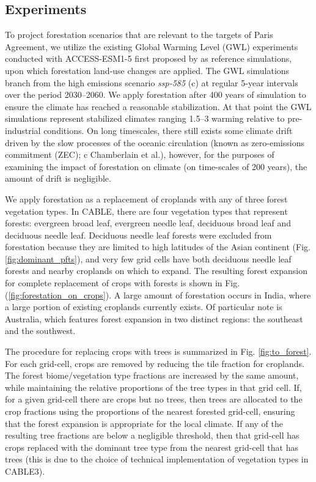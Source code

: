 \documentclass[]{article}
\begin{document}
\subsection{Experiments}

To project forestation scenarios that are relevant to the targets of Paris Agreement, we utilize the existing Global Warming Level (GWL) experiments conducted with ACCESS-ESM1-5 first proposed by \cite{king_studying_2021} as reference simulations, upon which forestation land-use changes are applied. The GWL simulations branch from the high emissions scenario \textit{ssp-585} (c) at regular 5-year intervals over the period 2030–2060. We apply forestation after 400 years of simulation to ensure the climate has reached a reasonable stabilization. At that point the GWL simulations represent stabilized climates ranging 1.5–3 \textcelsius warming relative to pre-industrial conditions. On long timescales, there still exists some climate drift driven by the slow processes of the oceanic circulation (known as zero-emissions commitment (ZEC); c Chamberlain et al.), however, for the purposes of examining the impact of forestation on climate (on time-scales of 200 years), the amount of drift is negligible.

We apply forestation as a replacement of croplands with any of three forest vegetation types.
In CABLE, there are four vegetation types that represent forests: evergreen broad leaf, evergreen needle leaf, deciduous broad leaf and deciduous needle leaf.
Deciduous needle leaf forests were excluded from forestation because they are limited to high latitudes of the Asian continent (Fig. \ref{fig:dominant_pfts}), and very few grid cells have both deciduous needle leaf forests and nearby croplands on which to expand.
The resulting forest expansion for complete replacement of crops with forests is shown in Fig. (\ref{fig:forestation_on_crops}).
A large amount of forestation occurs in India, where a large portion of existing croplands currently exists.
Of particular note is Australia, which features forest expansion in two distinct regions: the southeast and the southwest.

The procedure for replacing crops with trees is summarized in Fig. \ref{fig:to_forest}.
For each grid-cell, crops are removed by reducing the tile fraction for croplands.
The forest biome/vegetation type fractions are increased by the same amount, while maintaining the relative proportions of the tree types in that grid cell.
If, for a given grid-cell there are crops but no trees, then trees are allocated to the crop fractions using the proportions of the nearest forested grid-cell, ensuring that the forest expansion is appropriate for the local climate.
If any of the resulting tree fractions are below a negligible threshold, then that grid-cell has crops replaced with the dominant tree type from the nearest grid-cell that has trees (this is due to the choice of technical implementation of vegetation types in CABLE3).
\end{document}
